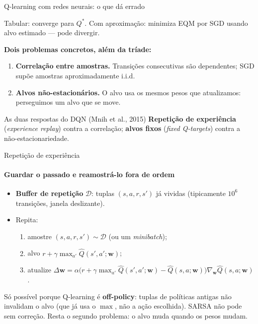 \documentclass[aspectratio=169, 11pt]{beamer}
\newcommand{\Qhat}{\widehat{Q}}
\newcommand{\wv}{\mathbf{w}}
\newcommand{\Qstar}{Q^{*}}
\begin{document}
\begin{frame}{Q-learning com redes neurais: o que dá errado}

  {\small Tabular: converge para $\Qstar$. Com aproximação: minimiza EQM
  por SGD usando alvo estimado — pode divergir.}

  \begin{alertabox}
    \textbf{Dois problemas concretos, além da tríade:}
    \begin{enumerate}\setlength{\itemsep}{0.25ex}
      \item \textbf{Correlação entre amostras.} Transições consecutivas são
        dependentes; SGD supõe amostras aproximadamente i.i.d.
      \item \textbf{Alvos não-estacionários.} O alvo usa os mesmos pesos
        que atualizamos: perseguimos um alvo que se move.
    \end{enumerate}
  \end{alertabox}

  \begin{defbox}{As duas respostas do DQN \textnormal{(Mnih et al., 2015)}}
    \textbf{Repetição de experiência} (\emph{experience replay}) contra a
    correlação; \textbf{alvos fixos} (\emph{fixed Q-targets}) contra a
    não-estacionariedade.
  \end{defbox}
\end{frame}

\begin{frame}{Repetição de experiência}
  \framesubtitle{Guardar o passado e reamostrá-lo fora de ordem}

  \begin{itemize}\setlength{\itemsep}{0.3ex}
    \item \textbf{Buffer de repetição} $\mathcal{D}$: tuplas $(s,a,r,s')$
      já vividas (tipicamente $10^6$ transições, janela deslizante).
    \item Repita:
      \begin{enumerate}\setlength{\itemsep}{0.15ex}
        \item amostre $(s,a,r,s') \sim \mathcal{D}$ (ou um \emph{minibatch});
        \item alvo $r + \gamma \max_{a'} \Qhat(s',a';\wv)$;
        \item atualize
          $\Delta\wv = \alpha\bigl(r + \gamma\max_{a'}\Qhat(s',a';\wv) - \Qhat(s,a;\wv)\bigr)\nabla_{\wv}\Qhat(s,a;\wv)$.
      \end{enumerate}
  \end{itemize}

  \begin{ideiabox}
    Só possível porque Q-learning é \textbf{off-policy}: tuplas de
    políticas antigas não invalidam o alvo (que já usa o $\max$, não a ação
    escolhida). SARSA não pode sem correção. Resta o segundo problema: o
    alvo muda quando os pesos mudam.
  \end{ideiabox}

\end{frame}
\end{document}
